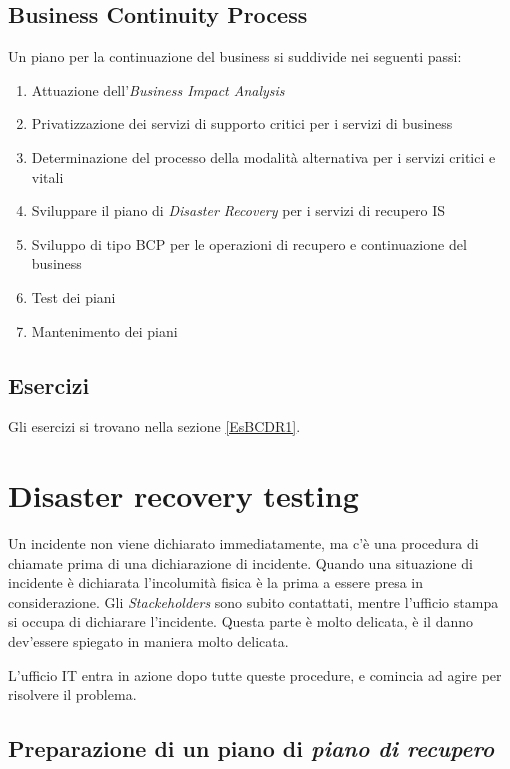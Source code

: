 \subsection{Business Continuity Process}

Un piano per la continuazione del business si suddivide nei seguenti passi:
\begin{enumerate}
  \item Attuazione dell'\textit{Business Impact Analysis}
  \item Privatizzazione dei servizi di supporto critici per i servizi di 
  business
  \item Determinazione del processo della modalità alternativa per i servizi 
  critici e vitali
  \item Sviluppare il piano di \textit{Disaster Recovery} per i servizi di 
  recupero IS
  \item Sviluppo di tipo BCP per le operazioni di recupero e continuazione del 
  business
  \item Test dei piani
  \item Mantenimento dei piani
\end{enumerate}

\subsection{Esercizi}

Gli esercizi si trovano nella sezione \ref{EsBCDR1}.

\section{Disaster recovery testing}

Un incidente non viene dichiarato immediatamente, ma c'è una procedura di 
chiamate prima di una dichiarazione di incidente. Quando una situazione di 
incidente è dichiarata l'incolumità fisica è la prima a essere presa in 
considerazione. Gli \textit{Stackeholders} sono subito contattati, mentre 
l'ufficio stampa si occupa di dichiarare l'incidente. Questa parte è molto 
delicata, è il danno dev'essere spiegato in maniera molto delicata.

L'ufficio IT entra in azione dopo tutte queste procedure, e comincia ad agire 
per risolvere il problema.

\subsection{Preparazione di un piano di \textit{piano di recupero}}

